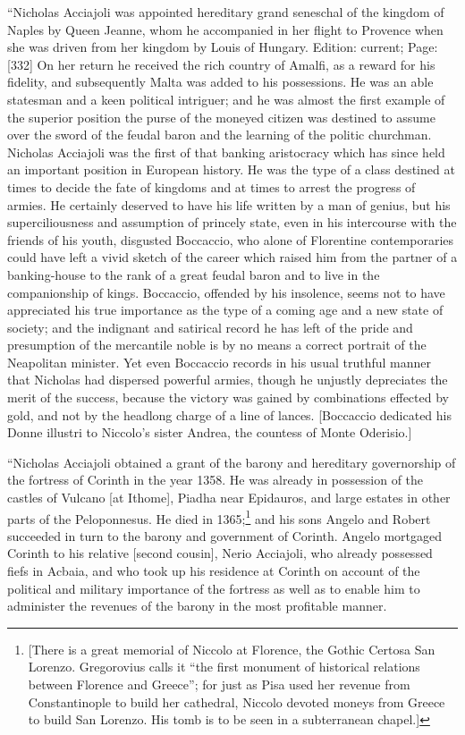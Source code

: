 \texthebrew{“}Nicholas Acciajoli was appointed hereditary grand seneschal of the kingdom of Naples by Queen Jeanne, whom he accompanied in her flight to Provence when she was driven from her kingdom by Louis of Hungary. Edition: current; Page: [332] On her return he received the rich country of Amalfi, as a reward for his fidelity, and subsequently Malta was added to his possessions. He was an able statesman and a keen political intriguer; and he was almost the first example of the superior position the purse of the moneyed citizen was destined to assume over the sword of the feudal baron and the learning of the politic churchman. Nicholas Acciajoli was the first of that banking aristocracy which has since held an important position in European history. He was the type of a class destined at times to decide the fate of kingdoms and at times to arrest the progress of armies. He certainly deserved to have his life written by a man of genius, but his superciliousness and assumption of princely state, even in his intercourse with the friends of his youth, disgusted Boccaccio, who alone of Florentine contemporaries could have left a vivid sketch of the career which raised him from the partner of a banking-house to the rank of a great feudal baron and to live in the companionship of kings. Boccaccio, offended by his insolence, seems not to have appreciated his true importance as the type of a coming age and a new state of society; and the indignant and satirical record he has left of the pride and presumption of the mercantile noble is by no means a correct portrait of the Neapolitan minister. Yet even Boccaccio records in his usual truthful manner that Nicholas had dispersed powerful armies, though he unjustly depreciates the merit of the success, because the victory was gained by combinations effected by gold, and not by the headlong charge of a line of lances. [Boccaccio dedicated his Donne illustri to Niccolo\texthebrew{}’s sister Andrea, the countess of Monte Oderisio.]

\texthebrew{“}Nicholas Acciajoli obtained a grant of the barony and hereditary governorship of the fortress of Corinth in the year 1358. He was already in possession of the castles of Vulcano [at Ithome], Piadha near Epidauros, and large estates in other parts of the Peloponnesus. He died in 1365;\footnote{[There is a great memorial of Niccolo at Florence, the Gothic Certosa San Lorenzo. Gregorovius calls it \texthebrew{“}the first monument of historical relations between Florence and Greece\texthebrew{}”; for just as Pisa used her revenue from Constantinople to build her cathedral, Niccolo devoted moneys from Greece to build San Lorenzo. His tomb is to be seen in a subterranean chapel.]} and his sons Angelo and Robert succeeded in turn to the barony and government of Corinth. Angelo mortgaged Corinth to his relative [second cousin], Nerio Acciajoli, who already possessed fiefs in Acbaia, and who took up his residence at Corinth on account of the political and military importance of the fortress as well as to enable him to administer the revenues of the barony in the most profitable manner.

